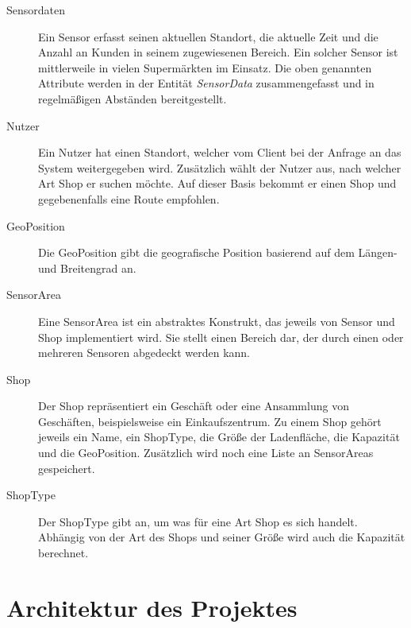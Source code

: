 \documentclass[runningheads]{llncs}
\begin{document}
\begin{description}
	\item[Sensordaten] Ein Sensor erfasst seinen aktuellen Standort, die aktuelle Zeit und die Anzahl an Kunden in seinem zugewiesenen Bereich. Ein solcher Sensor ist mittlerweile in vielen Supermärkten im Einsatz. Die oben genannten Attribute werden in der Entität \textit{SensorData} zusammengefasst und in regelmäßigen Abständen bereitgestellt.
	\item[Nutzer] Ein Nutzer hat einen Standort, welcher vom Client bei der Anfrage an das System weitergegeben wird. Zusätzlich wählt der Nutzer aus, nach welcher Art Shop er suchen möchte. Auf dieser Basis bekommt er einen Shop und gegebenenfalls eine Route empfohlen.
	\item[GeoPosition] Die GeoPosition gibt die geografische Position basierend auf dem Längen- und Breitengrad an.
	\item[SensorArea] Eine SensorArea ist ein abstraktes Konstrukt, das jeweils von Sensor und Shop implementiert wird. 
	Sie stellt einen Bereich dar, der durch einen oder mehreren Sensoren abgedeckt werden kann.
	\item[Shop] Der Shop repräsentiert ein Geschäft oder eine Ansammlung von Geschäften, beispielsweise ein Einkaufszentrum. Zu einem Shop gehört jeweils ein Name, ein ShopType, die Größe der Ladenfläche, die Kapazität und die GeoPosition. Zusätzlich wird noch eine Liste an SensorAreas gespeichert.
	\item[ShopType] Der ShopType gibt an, um was für eine Art Shop es sich handelt.
	Abhängig von der Art des Shops und seiner Größe wird auch die Kapazität berechnet.
\end{description}
\newpage


\section{Architektur des Projektes}
\end{document}

